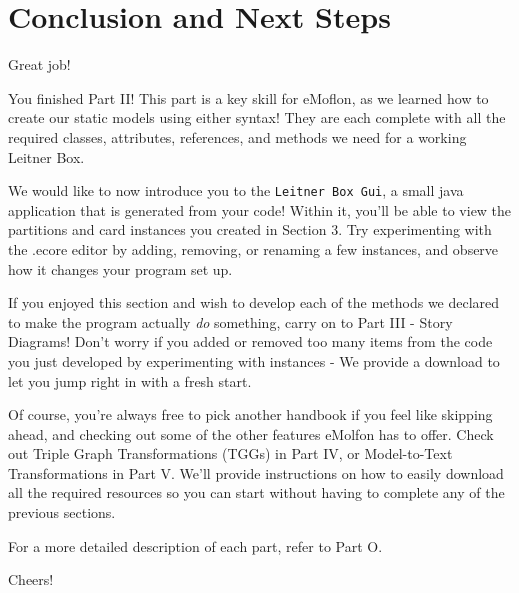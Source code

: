 \genHeader
\section{Conclusion and Next Steps}

\hypertarget{conclusion}{Great job!} You finished Part II! This part is a key skill for eMoflon, as we learned how to create our static models using either syntax! They are each complete with all the required classes, attributes, references, and methods we need for a working Leitner Box.

We would like to now introduce you to the \texttt{Leitner Box Gui}, a small java application that is generated from your code! Within it, you'll be able to view the partitions and card instances you created in Section 3. Try experimenting with the .ecore editor by adding, removing, or renaming a few instances, and observe how it changes your program set up.

If you enjoyed this section and wish to develop each of the methods we declared to make the program actually \emph{do} something, carry on to Part III - Story Diagrams! Don't worry if you added or removed too many items from the code you just developed by experimenting with instances - We provide a download to let you jump right in with a fresh start. 

Of course, you're always free to pick another handbook if you feel like skipping ahead, and checking out some of the other features eMolfon has to offer. Check out Triple Graph Transformations (TGGs)  in Part IV, or Model-to-Text Transformations in Part V. We'll provide instructions on how to easily download all the required resources so you can start without having to complete any of the previous sections. 

For a more detailed description of each part, refer to Part O.

Cheers!